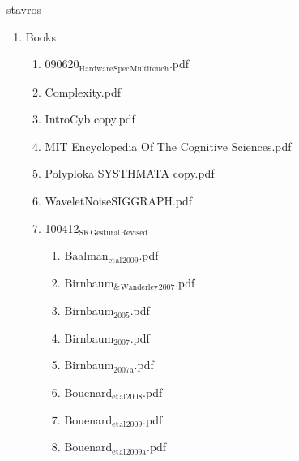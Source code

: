 \documentclass[11pt]{article}
\begin{document}
\item stavros
\label{sec-1-1-1-1-49-2}
\begin{enumerate}
\item Books
\label{sec-1-1-1-1-49-2-1}
\begin{enumerate}
\item 090620$_{\text{Hardware}}$$_{\text{Spec}}$$_{\text{Multitouch}}$.pdf
\label{sec-1-1-1-1-49-2-1-1}

\item Complexity.pdf
\label{sec-1-1-1-1-49-2-1-2}

\item IntroCyb copy.pdf
\label{sec-1-1-1-1-49-2-1-3}

\item MIT Encyclopedia Of The Cognitive Sciences.pdf
\label{sec-1-1-1-1-49-2-1-4}

\item Polyploka SYSTHMATA  copy.pdf
\label{sec-1-1-1-1-49-2-1-5}

\item WaveletNoiseSIGGRAPH.pdf
\label{sec-1-1-1-1-49-2-1-6}

\item 100412$_{\text{SK}}$$_{\text{Gestural}}$$_{\text{Revised}}$
\label{sec-1-1-1-1-49-2-1-7}
\begin{enumerate}
\item Baalman$_{\text{et}}$$_{\text{al}}$$_{\text{2009}}$.pdf
\label{sec-1-1-1-1-49-2-1-7-1}

\item Birnbaum$_{\text{\&}}$$_{\text{Wanderley}}$$_{\text{2007}}$.pdf
\label{sec-1-1-1-1-49-2-1-7-2}

\item Birnbaum$_{\text{2005}}$.pdf
\label{sec-1-1-1-1-49-2-1-7-3}

\item Birnbaum$_{\text{2007}}$.pdf
\label{sec-1-1-1-1-49-2-1-7-4}

\item Birnbaum$_{\text{2007a}}$.pdf
\label{sec-1-1-1-1-49-2-1-7-5}

\item Bouenard$_{\text{et}}$$_{\text{al}}$$_{\text{2008}}$.pdf
\label{sec-1-1-1-1-49-2-1-7-6}

\item Bouenard$_{\text{et}}$$_{\text{al}}$$_{\text{2009}}$.pdf
\label{sec-1-1-1-1-49-2-1-7-7}

\item Bouenard$_{\text{et}}$$_{\text{al}}$$_{\text{2009a}}$.pdf
\label{sec-1-1-1-1-49-2-1-7-8}


\end{enumerate}
\end{enumerate}
\end{enumerate}
\end{document}
